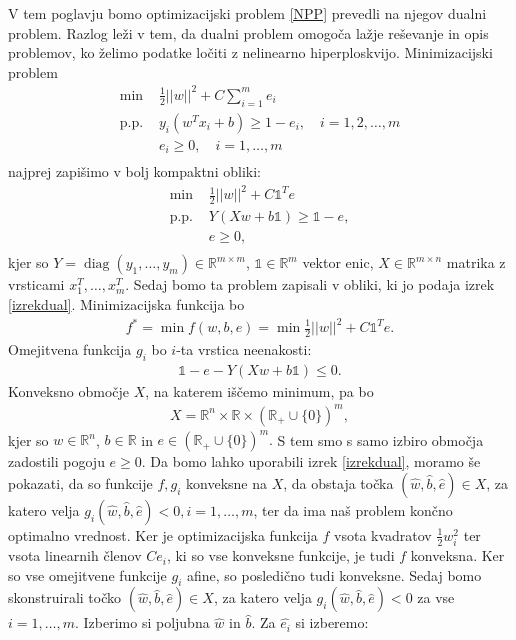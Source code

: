 \documentclass[mat1]{fmfdelo}
\newcommand{\R}{\mathbb R}
\DeclareMathOperator{\diag}{diag}
\begin{document}
V tem poglavju bomo optimizacijski problem \eqref{NPP}  prevedli na njegov dualni problem.  
Razlog leži v tem, da dualni problem omogoča lažje reševanje in opis problemov, ko želimo podatke ločiti z nelinearno hiperploskvijo.  
Minimizacijski problem
\begin{align*}
\min{} &\frac{1}{2}||w||^2 + C\sum_{i = 1}^{m}e_i \\ 
\text{p.p. } &y_i( w^T x_i + b)\ge 1 - e_i,  \quad i= 1, 2, \ldots, m \\
&e_i \ge 0, \quad i = 1, \ldots, m \\
\end{align*}
najprej zapišimo v bolj kompaktni obliki: 
\begin{align*}
\min{} &\frac{1}{2}||w||^2 + C \mathds{1}^Te \\ 
\text{p.p. } &Y( Xw + b \mathds{1})\ge \mathds{1} - e,  \\
&e \ge 0, \\
\end{align*}
kjer so $Y = \diag(y_1, \ldots, y_m)\in \R^{m\times m}$, $\mathds{1} \in \R^m$ vektor enic, $X \in \R^{m\times n}$ matrika z vrsticami $x_1^T, \ldots, x_m^T$. 
Sedaj bomo ta problem zapisali v obliki, ki jo podaja izrek \ref{izrekdual}. Minimizacijska funkcija bo 
\begin{align*}
f^* = \min f(w, b, e) = \min \frac{1}{2}||w||^2 + C \mathds{1}^Te.
\end{align*}
Omejitvena funkcija $g_i$ bo $i$-ta vrstica neenakosti:
\begin{align*}
\mathds{1} - e - Y( Xw + b \mathds{1}) \le 0.
\end{align*}
Konveksno območje $X$, na katerem iščemo minimum, pa bo
\begin{align*}
X = \R^n \times \R \times (\R_+ \cup \{0\})^m,
\end{align*}
kjer so $w\in \R^n$, $b \in \R$ in $e \in  (\R_+ \cup \{0\})^m.$ S tem smo s samo izbiro območja zadostili pogoju $e \ge 0$. Da bomo lahko uporabili izrek \ref{izrekdual}, moramo še pokazati, da so funkcije $f, g_i$ konveksne na $X$, da obstaja točka $(\widehat{w}, \widehat{b}, \widehat{e}) \in X$, za katero velja $g_i(\widehat{w}, \widehat{b}, \widehat{e}) < 0, i = 1, \ldots, m$, ter da ima naš problem končno optimalno vrednost.  Ker je optimizacijska funkcija $f$ vsota kvadratov $\frac{1}{2}w_i^2$ ter vsota linearnih členov $Ce_i$, ki so vse konveksne funkcije, je tudi $f$ konveksna.  Ker so vse omejitvene funkcije $g_i$ afine, so  posledično tudi konveksne. Sedaj bomo skonstruirali točko $(\widehat{w}, \widehat{b}, \widehat{e}) \in X$, za katero velja $g_i(\widehat{w}, \widehat{b}, \widehat{e}) < 0$ za vse $i = 1, \ldots, m$. Izberimo si poljubna $\widehat{w}$ in $\widehat{b}$. Za $\widehat{e_i}$ si izberemo: 
\end{document}

